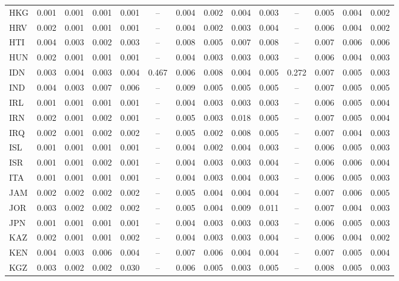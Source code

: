 \begin{longtable}{l*{13}{c}}
HKG & 0.001 & 0.001 & 0.001 & 0.001 & -- & 0.004 & 0.002 & 0.004 & 0.003 & -- & 0.005 & 0.004 & 0.002 \\
HRV & 0.002 & 0.001 & 0.001 & 0.001 & -- & 0.004 & 0.002 & 0.003 & 0.004 & -- & 0.006 & 0.004 & 0.002 \\
HTI & 0.004 & 0.003 & 0.002 & 0.003 & -- & 0.008 & 0.005 & 0.007 & 0.008 & -- & 0.007 & 0.006 & 0.006 \\
HUN & 0.002 & 0.001 & 0.001 & 0.001 & -- & 0.004 & 0.003 & 0.003 & 0.003 & -- & 0.006 & 0.004 & 0.003 \\
IDN & 0.003 & 0.004 & 0.003 & 0.004 & 0.467 & 0.006 & 0.008 & 0.004 & 0.005 & 0.272 & 0.007 & 0.005 & 0.003 \\
IND & 0.004 & 0.003 & 0.007 & 0.006 & -- & 0.009 & 0.005 & 0.005 & 0.005 & -- & 0.007 & 0.005 & 0.005 \\
IRL & 0.001 & 0.001 & 0.001 & 0.001 & -- & 0.004 & 0.003 & 0.003 & 0.003 & -- & 0.006 & 0.005 & 0.004 \\
IRN & 0.002 & 0.001 & 0.002 & 0.001 & -- & 0.005 & 0.003 & 0.018 & 0.005 & -- & 0.007 & 0.005 & 0.004 \\
IRQ & 0.002 & 0.001 & 0.002 & 0.002 & -- & 0.005 & 0.002 & 0.008 & 0.005 & -- & 0.007 & 0.004 & 0.003 \\
ISL & 0.001 & 0.001 & 0.001 & 0.001 & -- & 0.004 & 0.002 & 0.004 & 0.003 & -- & 0.006 & 0.005 & 0.003 \\
ISR & 0.001 & 0.001 & 0.002 & 0.001 & -- & 0.004 & 0.003 & 0.003 & 0.004 & -- & 0.006 & 0.006 & 0.004 \\
ITA & 0.001 & 0.001 & 0.001 & 0.001 & -- & 0.004 & 0.003 & 0.004 & 0.003 & -- & 0.006 & 0.005 & 0.003 \\
JAM & 0.002 & 0.002 & 0.002 & 0.002 & -- & 0.005 & 0.004 & 0.004 & 0.004 & -- & 0.007 & 0.006 & 0.005 \\
JOR & 0.003 & 0.002 & 0.002 & 0.002 & -- & 0.005 & 0.004 & 0.009 & 0.011 & -- & 0.007 & 0.004 & 0.003 \\
JPN & 0.001 & 0.001 & 0.001 & 0.001 & -- & 0.004 & 0.003 & 0.003 & 0.003 & -- & 0.006 & 0.005 & 0.003 \\
KAZ & 0.002 & 0.001 & 0.001 & 0.002 & -- & 0.004 & 0.003 & 0.003 & 0.004 & -- & 0.006 & 0.004 & 0.002 \\
KEN & 0.004 & 0.003 & 0.006 & 0.004 & -- & 0.007 & 0.006 & 0.004 & 0.004 & -- & 0.007 & 0.005 & 0.004 \\
KGZ & 0.003 & 0.002 & 0.002 & 0.030 & -- & 0.006 & 0.005 & 0.003 & 0.005 & -- & 0.008 & 0.005 & 0.003 \\

\end{longtable}
